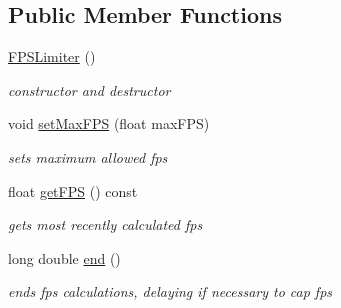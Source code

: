 \subsection*{Public Member Functions}
\begin{DoxyCompactItemize}
\item 
\mbox{\label{classnta_1_1FPSLimiter_a7a866e0bc883bdd26e80e95748f4052c}} 
\hyperlink{classnta_1_1FPSLimiter_a7a866e0bc883bdd26e80e95748f4052c}{F\+P\+S\+Limiter} ()
\begin{DoxyCompactList}\small\item\em constructor and destructor \end{DoxyCompactList}\item 
\mbox{\label{classnta_1_1FPSLimiter_ac72ab398095957d9cffa07859e1f97a4}} 
void \hyperlink{classnta_1_1FPSLimiter_ac72ab398095957d9cffa07859e1f97a4}{set\+Max\+F\+PS} (float max\+F\+PS)
\begin{DoxyCompactList}\small\item\em sets maximum allowed fps \end{DoxyCompactList}\item 
\mbox{\label{classnta_1_1FPSLimiter_a682d191b70ddecf8f7ed776dc586fe27}} 
float \hyperlink{classnta_1_1FPSLimiter_a682d191b70ddecf8f7ed776dc586fe27}{get\+F\+PS} () const
\begin{DoxyCompactList}\small\item\em gets most recently calculated fps \end{DoxyCompactList}\item 
\mbox{\label{classnta_1_1FPSLimiter_a17003ecbc30d60c58112615fcaee4d1e}} 
long double \hyperlink{classnta_1_1FPSLimiter_a17003ecbc30d60c58112615fcaee4d1e}{end} ()
\begin{DoxyCompactList}\small\item\em ends fps calculations, delaying if necessary to cap fps \end{DoxyCompactList}\end{DoxyCompactItemize}

